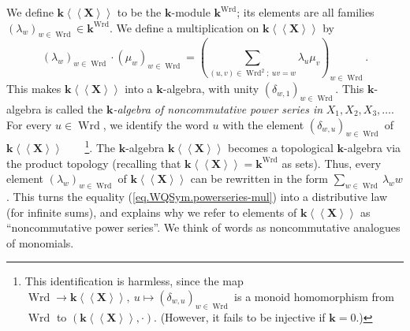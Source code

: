 \documentclass
[numbers=enddot,12pt,final,onecolumn,notitlepage,abstracton]{scrartcl}%
\theoremstyle{definition}
\let\sumnonlimits\sum
\renewcommand{\sum}{\sumnonlimits\limits}
\begin{document}
We define $\mathbf{k}\left\langle \left\langle \mathbf{X}\right\rangle
\right\rangle $ to be the $\mathbf{k}$-module $\mathbf{k}^{\operatorname*{Wrd}%
}$; its elements are all families $\left(  \lambda_{w}\right)  _{w\in
\operatorname*{Wrd}}\in\mathbf{k}^{\operatorname*{Wrd}}$. We define a
multiplication on\textbf{ }$\mathbf{k}\left\langle \left\langle \mathbf{X}%
\right\rangle \right\rangle $ by
\begin{equation}
\left(  \lambda_{w}\right)  _{w\in\operatorname*{Wrd}}\cdot\left(  \mu
_{w}\right)  _{w\in\operatorname*{Wrd}}=\left(  \sum_{\left(  u,v\right)
\in\operatorname*{Wrd}\nolimits^{2};\ uv=w}\lambda_{u}\mu_{v}\right)
_{w\in\operatorname*{Wrd}}. \label{eq.WQSym.powerseries-mul}%
\end{equation}
This makes $\mathbf{k}\left\langle \left\langle \mathbf{X}\right\rangle
\right\rangle $ into a $\mathbf{k}$-algebra, with unity $\left(  \delta
_{w,1}\right)  _{w\in\operatorname*{Wrd}}$. This $\mathbf{k}$-algebra is
called the $\mathbf{k}$\textit{-algebra of noncommutative power series in
}$X_{1},X_{2},X_{3},\ldots$. For every $u\in\operatorname*{Wrd}$, we identify
the word $u$ with the element $\left(  \delta_{w,u}\right)  _{w\in
\operatorname*{Wrd}}$ of $\mathbf{k}\left\langle \left\langle \mathbf{X}%
\right\rangle \right\rangle $\ \ \ \ \footnote{This identification is
harmless, since the map $\operatorname*{Wrd}\rightarrow\mathbf{k}\left\langle
\left\langle \mathbf{X}\right\rangle \right\rangle ,\ u\mapsto\left(
\delta_{w,u}\right)  _{w\in\operatorname*{Wrd}}$ is a monoid homomorphism from
$\operatorname*{Wrd}$ to $\left(  \mathbf{k}\left\langle \left\langle
\mathbf{X}\right\rangle \right\rangle ,\cdot\right)  $. (However, it fails to
be injective if $\mathbf{k}=0$.)}. The $\mathbf{k}$-algebra $\mathbf{k}%
\left\langle \left\langle \mathbf{X}\right\rangle \right\rangle $ becomes a
topological $\mathbf{k}$-algebra via the product topology (recalling that
$\mathbf{k}\left\langle \left\langle \mathbf{X}\right\rangle \right\rangle
=\mathbf{k}^{\operatorname*{Wrd}}$ as sets). Thus, every element $\left(
\lambda_{w}\right)  _{w\in\operatorname*{Wrd}}$ of $\mathbf{k}\left\langle
\left\langle \mathbf{X}\right\rangle \right\rangle $ can be rewritten in the
form $\sum_{w\in\operatorname*{Wrd}}\lambda_{w}w$. This turns the equality
(\ref{eq.WQSym.powerseries-mul}) into a distributive law (for infinite sums),
and explains why we refer to elements of $\mathbf{k}\left\langle \left\langle
\mathbf{X}\right\rangle \right\rangle $ as \textquotedblleft noncommutative
power series\textquotedblright. We think of words as noncommutative analogues
of monomials.
\end{document}
